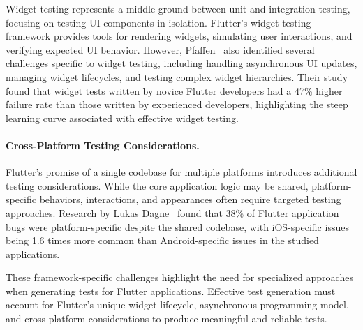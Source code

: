 \hspace{0.5cm} Widget testing represents a middle ground between unit and integration testing, focusing on testing UI components in isolation. Flutter's widget testing framework provides tools for rendering widgets, simulating user interactions, and verifying expected UI behavior. However, Pfaffen~\cite{FlutterTesting} also identified several challenges specific to widget testing, including handling asynchronous UI updates, managing widget lifecycles, and testing complex widget hierarchies. Their study found that widget tests written by novice Flutter developers had a 47\% higher failure rate than those written by experienced developers, highlighting the steep learning curve associated with effective widget testing.

\paragraph{Cross-Platform Testing Considerations.} Flutter's promise of a single codebase for multiple platforms introduces additional testing considerations. While the core application logic may be shared, platform-specific behaviors, interactions, and appearances often require targeted testing approaches. Research by Lukas Dagne~\cite{CrossPlatformTesting} found that 38\% of Flutter application bugs were platform-specific despite the shared codebase, with iOS-specific issues being 1.6 times more common than Android-specific issues in the studied applications.

\hspace{0.5cm} These framework-specific challenges highlight the need for specialized approaches when generating tests for Flutter applications. Effective test generation must account for Flutter's unique widget lifecycle, asynchronous programming model, and cross-platform considerations to produce meaningful and reliable tests.

